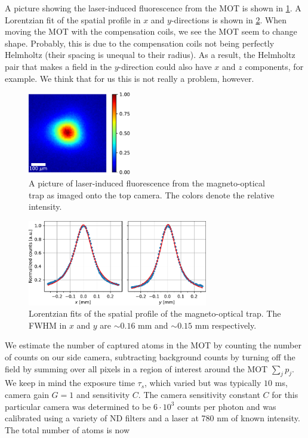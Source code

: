 A picture showing the laser-induced fluorescence from the MOT is shown in \cref{fig:LiF}.
A Lorentzian fit of the spatial profile in $x$ and $y$-directions is shown in \cref{fig:TopFit}.
When moving the MOT with the compensation coils, we see the MOT seem to change shape. 
Probably, this is due to the compensation coils not being perfectly Helmholtz (their spacing is unequal to their radius). 
As a result, the Helmholtz pair that makes a field in the $y$-direction could also have $x$ and $z$ components, for example. We think that for us this is not really a problem, however.

\begin{figure}
    \centering
    \includegraphics[width=0.4\textwidth]{figures/MOTfluoresenceTop.pdf}
    \caption{A picture of laser-induced fluorescence from the magneto-optical trap as imaged onto the top camera. 
    The colors denote the relative intensity. }
    \label{fig:LiF}
\end{figure}

\begin{figure}
    \centering
    \includegraphics[width=0.7\textwidth]{figures/FitTop.pdf}
    \caption{Lorentzian fits of the spatial profile of the magneto-optical trap. 
    The FWHM in $x$ and $y$ are $\sim 0.16$ mm and $\sim 0.15$ mm respectively. }
    \label{fig:TopFit}
\end{figure}
   
We estimate the number of captured atoms in the MOT by counting the number of counts on our side camera, subtracting background counts by turning off the field by summing over all pixels in a region of interest around the MOT $\sum_j p_j$.
We keep in mind the exposure time $\tau_s$, which varied but was typically $10$ ms, camera gain $G = 1$ and sensitivity $C$.
The camera sensitivity constant $C$ for this particular camera was determined to be $6 \cdot 10^3$ counts per photon and was calibrated using a variety of ND filters and a laser at 780 nm of known intensity. The total number of atoms is now
 
